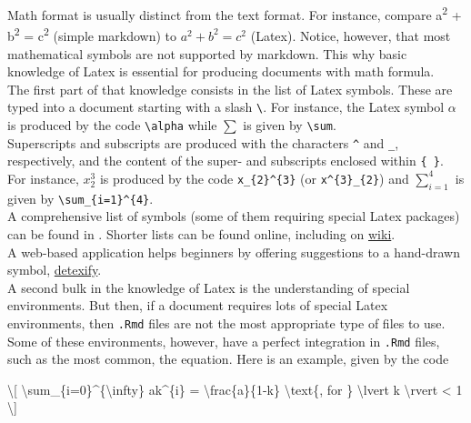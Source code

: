 \documentclass[]{book}
\newenvironment{Shaded}{}{}
\newcommand{\NormalTok}[1]{#1}
\theoremstyle{definition}
\theoremstyle{definition}
\theoremstyle{definition}
\theoremstyle{remark}
\begin{document}
Math format is usually distinct from the text format. For instance,
compare a\textsuperscript{2} + b\textsuperscript{2} =
c\textsuperscript{2} (simple markdown) to \(a^2 + b^2 = c^2\) (Latex).
Notice, however, that most mathematical symbols are not supported by
markdown. This why basic knowledge of Latex is essential for producing
documents with math formula.\\
The first part of that knowledge consists in the list of Latex symbols.
These are typed into a document starting with a slash
\texttt{\textbackslash{}}. For instance, the Latex symbol \(\alpha\) is
produced by the code \texttt{\textbackslash{}alpha} while \(\sum\) is
given by \texttt{\textbackslash{}sum}.\\
Superscripts and subscripts are produced with the characters
\texttt{\^{}} and \texttt{\_}, respectively, and the content of the
super- and subscripts enclosed within \texttt{\{\ \}}. For instance,
\(x_{2}^{3}\) is produced by the code \texttt{x\_\{2\}\^{}\{3\}} (or
\texttt{x\^{}\{3\}\_\{2\}}) and \(\sum_{i=1}^{4}\) is given by
\texttt{\textbackslash{}sum\_\{i=1\}\^{}\{4\}}.\\
A comprehensive list of symbols (some of them requiring special Latex
packages) can be found in \citet{latexlist}. Shorter lists can be found
online, including on
\href{https://oeis.org/wiki/List_of_LaTeX_mathematical_symbols}{wiki}.\\
A web-based application helps beginners by offering suggestions to a
hand-drawn symbol,
\href{http://detexify.kirelabs.org/classify.html}{detexify}.\\
A second bulk in the knowledge of Latex is the understanding of special
environments. But then, if a document requires lots of special Latex
environments, then \texttt{.Rmd} files are not the most appropriate type
of files to use.\\
Some of these environments, however, have a perfect integration in
\texttt{.Rmd} files, such as the most common, the equation. Here is an
example, given by the code

\begin{Shaded}
\begin{Highlighting}[]
\NormalTok{\textbackslash{}[}
\NormalTok{\textbackslash{}sum_\{i=0\}^\{\textbackslash{}infty\} ak^\{i\} = \textbackslash{}frac\{a\}\{1-k\} \textbackslash{}text\{, for \}  \textbackslash{}lvert k \textbackslash{}rvert < 1}
\NormalTok{\textbackslash{}]}
\end{Highlighting}
\end{Shaded}
\end{document}
